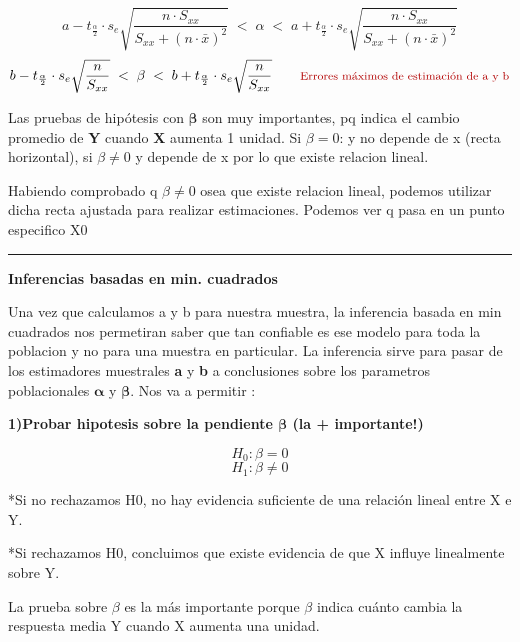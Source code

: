 \documentclass[10pt,a4paper]{article}
\begin{document}
\[
a - t_{\frac{\alpha}{2}}\cdot s_e\sqrt{\frac{n\cdot S_{xx}}{S_{xx}+(n\cdot\bar{x})^2}}
\;<\; \alpha \;<\;
a + t_{\frac{\alpha}{2}}\cdot s_e\sqrt{\frac{n\cdot S_{xx}}{S_{xx}+(n\cdot\bar{x})^2}}
\]
\[
b - t_{\frac{\alpha}{2}}\cdot s_e\sqrt{\frac{n}{S_{xx}}}
\;<\; \beta \;<\;
b + t_{\frac{\alpha}{2}}\cdot s_e\sqrt{\frac{n}{S_{xx}}}
\qquad
{\footnotesize\textcolor{red!70!black}{\text{Errores máximos de estimación de a y b}}}
\]

Las pruebas de hipótesis con $\boldsymbol{\beta}$ son muy importantes, pq indica el cambio promedio de \textbf{Y} cuando \textbf{X} aumenta 1 unidad. Si $\beta=0$: y no depende de x (recta horizontal), si $\beta \neq 0$ y depende de x por lo que existe relacion lineal.

Habiendo comprobado q $\beta \neq 0$ osea que existe relacion lineal, podemos utilizar dicha recta ajustada para realizar estimaciones. Podemos ver q pasa en un punto especifico X0

\vspace{4pt}
\hrule
\vspace{4pt}

\begin{center}
{\large\bfseries Inferencias basadas en min. cuadrados}
\end{center}
\vspace{-2pt}

Una vez que calculamos a y b para nuestra muestra, la inferencia basada en min cuadrados nos permetiran saber que tan confiable es ese modelo para toda la poblacion y no para una muestra en particular. La inferencia sirve para pasar de los estimadores muestrales \textbf{a} y \textbf{b} a conclusiones sobre los parametros poblacionales $\boldsymbol{\alpha}$ y $\boldsymbol{\beta}$. Nos va a permitir :

\textbf{1)Probar hipotesis sobre la pendiente $\boldsymbol{\beta}$ (la + importante!)}

\begin{minipage}[t]{0.24\textwidth}
\vspace{0pt}
\[
H_0 : \beta = 0
\]
\[
H_1 : \beta \neq 0
\]
\end{minipage}
\begin{minipage}[t]{0.72\textwidth}
\vspace{0pt}
{\small
*Si no rechazamos H0, no hay evidencia suficiente de una relación lineal entre X e Y.

*Si rechazamos H0, concluimos que existe evidencia de que X influye linealmente sobre Y.

La prueba sobre $\beta$ es la más importante porque $\beta$ indica cuánto cambia la respuesta media Y cuando X aumenta una unidad.
}
\end{minipage}
\end{document}
